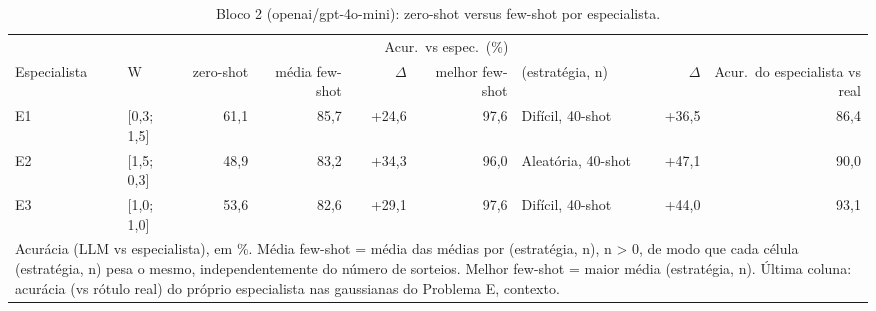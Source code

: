 \begin{table}[htbp]
\centering
\small
\caption{Bloco 2 (openai/gpt-4o-mini): zero-shot versus few-shot por especialista.}
\label{tab:bloco2_E_zero_vs_fewshot_por_especialista_gpt4mini}
\begin{tabular}{llrrrrlrr}
\toprule
 &  & \multicolumn{6}{c}{Acur.\ vs espec.\ (\%)} &  \\ \cmidrule(lr){3-8}
Especialista & W & zero-shot & média few-shot & $\Delta$ & melhor few-shot & (estratégia, n) & $\Delta$ & Acur.\ do especialista vs real \\
\midrule
E1 & [0,3; 1,5] & 61,1 & 85,7 & +24,6 & 97,6 & Difícil, 40-shot & +36,5 & 86,4 \\
E2 & [1,5; 0,3] & 48,9 & 83,2 & +34,3 & 96,0 & Aleatória, 40-shot & +47,1 & 90,0 \\
E3 & [1,0; 1,0] & 53,6 & 82,6 & +29,1 & 97,6 & Difícil, 40-shot & +44,0 & 93,1 \\
\bottomrule
\multicolumn{9}{p{0.95\linewidth}}{\footnotesize Acurácia (LLM vs especialista), em \%. Média few-shot = média das médias por (estratégia, n), n > 0, de modo que cada célula (estratégia, n) pesa o mesmo, independentemente do número de sorteios. Melhor few-shot = maior média (estratégia, n). Última coluna: acurácia (vs rótulo real) do próprio especialista nas gaussianas do Problema E, contexto.} \\
\end{tabular}
\end{table}
